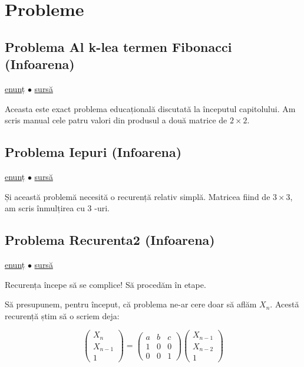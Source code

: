 \documentclass[../main.tex]{subfiles}
\begin{document}
\section{Probleme}

\subsection{Problema Al k-lea termen Fibonacci (Infoarena)}
\label{problem:kfib}

\href{https://www.infoarena.ro/problema/kfib}{enunț}
$\bullet$
\hyperref[code:kfib]{sursă}

Aceasta este exact problema educațională discutată la începutul capitolului. Am scris manual cele patru valori din produsul a două matrice de $2 \times 2$.

\subsection{Problema Iepuri (Infoarena)}
\label{problem:iepuri}

\href{https://www.infoarena.ro/problema/iepuri}{enunț}
$\bullet$
\hyperref[code:iepuri]{sursă}

Și această problemă necesită o recurență relativ simplă. Matricea fiind de $3 \times 3$, am scris înmulțirea cu 3 -uri.

\subsection{Problema Recurenta2 (Infoarena)}
\label{problem:recurenta2}

\href{https://www.infoarena.ro/problema/recurenta2}{enunț}
$\bullet$
\hyperref[code:recurenta2]{sursă}

Recurența începe să se complice! Să procedăm în etape.

Să presupunem, pentru început, că problema ne-ar cere doar să aflăm $X_n$. Acestă recurență știm să  o scriem deja:

$$
\begin{pmatrix}
  X_n \\ X_{n-1} \\ 1
\end{pmatrix}
=
\begin{pmatrix}
  a & b & c\\
  1 & 0 & 0\\
  0 & 0 & 1
\end{pmatrix}
\begin{pmatrix}
  X_{n-1} \\ X_{n-2}\\ 1
\end{pmatrix}
$$
\end{document}
